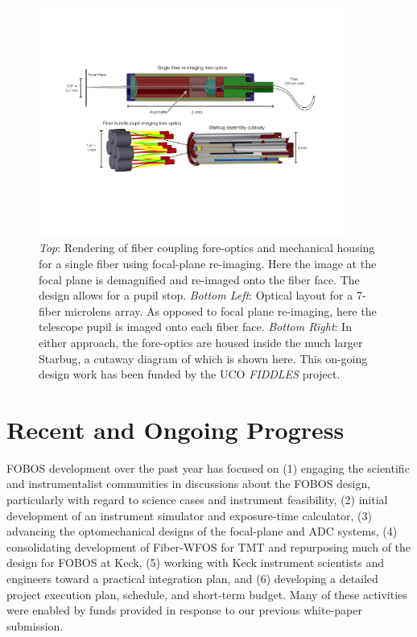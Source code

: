 

\begin{figure}[h!]
\includegraphics[width=0.9\textwidth]{figs/FOBOS_ForeOptics_v1.pdf}
\caption{\small {\it
Top}: Rendering of fiber coupling fore-optics and mechanical housing for a single fiber using focal-plane re-imaging.  Here the image at the focal plane is demagnified and re-imaged onto the fiber face.  The design allows for a pupil stop. {\it Bottom Left}: Optical layout for a 7-fiber microlens array.  As opposed to focal plane re-imaging, here the telescope pupil is imaged onto each fiber face.  {\it Bottom Right}: In either approach, the fore-optics are housed inside the much larger Starbug, a cutaway diagram of which is shown here. This on-going design work has been funded by the UCO \emph{FIDDLES} project.}
\label{fig:foreoptics}
\end{figure}


\section{Recent and Ongoing Progress}
\label{sec:progress}

FOBOS development over the past year has focused on (1) engaging the
scientific and instrumentalist communities in discussions about the
FOBOS design, particularly with regard to science cases and
instrument feasibility, (2) initial development of an instrument
simulator and exposure-time calculator, (3) advancing the
optomechanical designs of the focal-plane and ADC systems, (4)
consolidating development of Fiber-WFOS for TMT and repurposing much
of the design for FOBOS at Keck, (5) working with Keck instrument
scientists and engineers toward a practical integration plan, and (6)
developing a detailed project execution plan, schedule, and short-term budget.
Many of these activities were enabled by funds provided in response
to our previous white-paper submission.


